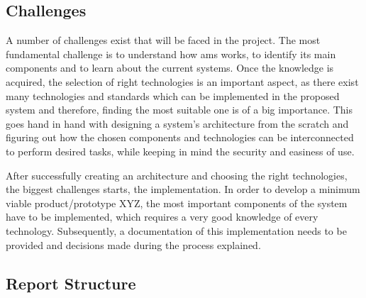 \subsection{Challenges} \label{challenges}
A number of challenges exist that will be faced in the project. The most fundamental challenge is to understand how \acrshort{ams} works, to identify its main components and to learn about the current systems. Once the knowledge is acquired, the selection of right technologies is an important aspect, as there exist many technologies and standards which can be implemented in the proposed system and therefore, finding the most suitable one is of a big importance. This goes hand in hand with designing a system’s architecture from the scratch and figuring out how the chosen components and technologies can be interconnected to perform desired tasks, while keeping in mind the security and easiness of use.

After successfully creating an architecture and choosing the right technologies, the biggest challenges starts, the implementation. In order to develop a minimum viable product/prototype XYZ, the most important components of the system have to be implemented, which requires a very good knowledge of every technology. Subsequently, a documentation of this implementation needs to be provided and decisions made during the process explained.

\subsection{Report Structure}
